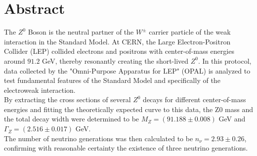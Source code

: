 \section*{Abstract}
	The $Z^0$ Boson is the neutral partner of the $W^{\pm}$ carrier particle of the weak interaction in the Standard Model. At CERN, the Large Electron-Positron Collider (LEP) collided electrons and positrons with center-of-mass energies around $91.2$ GeV, thereby resonantly creating the short-lived $Z^0$. In this protocol, data collected by the "Omni-Purpose Apparatus for LEP" (OPAL) is analyzed to test fundamental features of the Standard Model and specifically of the electroweak interaction.\\
	By extracting the cross sections of several $Z^0$ decays for different center-of-mass energies and fitting the theoretically expected curve to this data, the Z0 mass and the total decay width were determined to be $M_Z=(91.188\pm0.008)$ GeV and $\Gamma_Z= (2.516\pm0.017)$ GeV.\\
	
	The number of neutrino generations was then calculated to be $n_{\nu}=2.93\pm0.26$, confirming with reasonable certainty the existence of three neutrino generations.